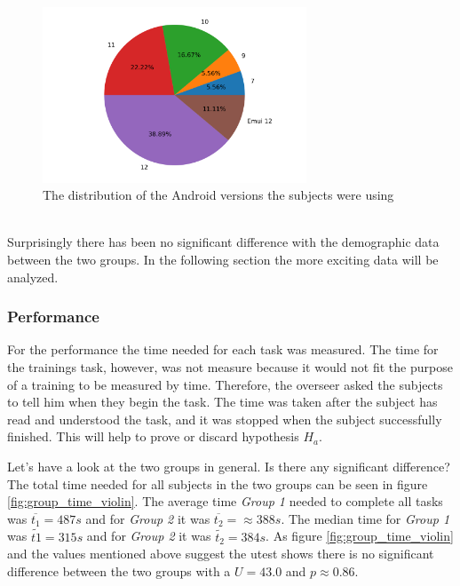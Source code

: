 \begin{figure}[htb]
  \centering
  \includegraphics[width=0.7\textwidth]{Evaluation/img/droid_version.png}
  \caption{The distribution of the Android versions the subjects were using}\label{fig:android_version}
\end{figure}

\mbox{}\\
Surprisingly there has been no significant difference with the demographic data between the two groups.
In the following section the more exciting data will be analyzed. 

\subsubsection{Performance}
For the performance the time needed for each task was measured.
The time for the trainings task, however, was not measure because it would not fit the purpose of a training to be measured by time.
Therefore, the overseer asked the subjects to tell him when they begin the task. 
The time was taken after the subject has read and understood the task, and it was stopped when the subject successfully finished.
This will help to prove or discard hypothesis $H_{a}$.

Let's have a look at the two groups in general.
Is there any significant difference?
The total time needed for all subjects in the two groups can be seen in figure \ref{fig:group_time_violin}.
The average time \textit{Group 1} needed to complete all tasks was $\overline{t_1} = 487s$ and for \textit{Group 2} it was $\overline{t_2} = \approx388s$.
The median time for \textit{Group 1} was $\widetilde{t1} = 315s$ and for \textit{Group 2} it was $\widetilde{t_2} = 384s$.
As figure \ref{fig:group_time_violin} and the values mentioned above suggest the \gls{utest} shows there is no significant difference between the two groups with a $U = 43.0$ and $p \approx 0.86$.

